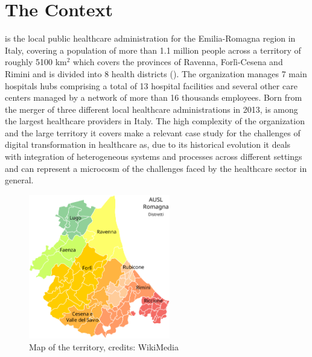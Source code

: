 \section{The \ausl{} Context}

\auslLong{} is the local public healthcare administration for the Emilia-Romagna region in Italy, covering a population of more than 1.1 million people across a territory of roughly 5100 km$^2$ which covers the provinces of Ravenna, Forlì-Cesena and Rimini and is divided into 8 health districts ().
%
The organization manages 7 main hospitals hubs comprising a total of 13 hospital facilities and several other care centers managed by a network of more than 16 thousands employees. 
%
Born from the merger of three different local healthcare administrations in 2013, \ausl{} is among the largest healthcare providers in Italy.
%
The high complexity of the organization and the large territory it covers make \ausl{} a relevant case study for the challenges of digital transformation in healthcare as, due to its historical evolution it deals with integration of heterogeneous systems and processes across different settings and can represent a microcosm of the challenges faced by the healthcare sector in general.


\begin{figure}[t]
    \centering
    \includegraphics[width=0.55\textwidth]{figures/mappa_ausl.png} 
    \caption[Map of the \ausl{} territory, credits: WikiMedia]{Map of the \ausl{} territory, credits: WikiMedia\protect\footnotemark[1] }
    \label{fig:ausl-map}
\end{figure}




